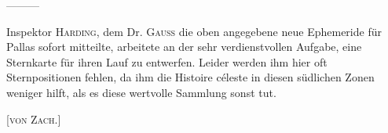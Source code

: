 —\quad—\quad—

Inspektor \textsc{Harding}, dem Dr. \textsc{Gauss} die oben angegebene neue Ephemeride für Pallas sofort mitteilte, arbeitete an der sehr verdienstvollen Aufgabe, eine Sternkarte für ihren Lauf zu entwerfen. Leider werden ihm hier oft Sternpositionen fehlen, da ihm die Histoire céleste in diesen südlichen Zonen weniger hilft, als es diese wertvolle Sammlung sonst tut.

\hfill[\textsc{von Zach.}]
